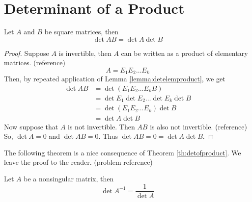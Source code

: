 \documentclass{ximera}
\begin{document}
\section*{Determinant of a Product}
\begin{theorem}\label{th:detofproduct}
Let $A$ and $B$ be square matrices, then
$$\det{AB}=\det{A}\det{B}$$
\end{theorem}
\begin{proof}
Suppose $A$ is invertible, then $A$ can be written as a product of elementary matrices. ({\color{red}reference})
$$A=E_1E_2\ldots E_k$$
Then, by repeated application of Lemma \ref{lemma:detelemproduct}, we get
\begin{align*}\det{AB}&=\det{(E_1E_2\ldots E_kB)}\\
&=\det{E_1}\det{E_2}\ldots \det{E_k}\det{B}\\
&=\det{(E_1E_2\ldots E_k)}\det{B}\\
&=\det{A}\det{B}
\end{align*}
Now suppose that $A$ is not invertible.  Then $AB$ is also not invertible. ({\color{red}reference}) So, $\det{A}=0$ and $\det{AB}=0$.  Thus  $\det{AB}=0=\det{A}\det{B}$.
\end{proof}
The following theorem is a nice consequence of Theorem \ref{th:detofproduct}.  We leave the proof to the reader. ({\color{red}problem reference})
\begin{theorem}\label{th:detofinverse} Let $A$ be a nonsingular matrix, then
$$\det{A^{-1}}=\frac{1}{\det{A}}$$
\end{theorem}
\end{document}
